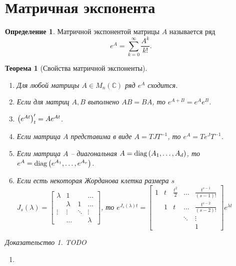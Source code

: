 \documentclass[a5paper, 10pt]{article}
\theoremstyle{definition}
\newtheorem{Def}{Определение}
\theoremstyle{plain}
\newtheorem{Th}{Теорема}
\theoremstyle{remark}
\newtheorem*{Proof}{Доказательство}
\begin{document}
	\section{Матричная экспонента}
		\begin{Def}
			Матричной экспонентой матрицы $A$ называется ряд
			\[
			e^A = \sum\limits_{k=0}^{\infty} \frac{A^k}{k!}.
			\]
		\end{Def}
		\begin{Th}[Свойства матричной экспоненты]
			\hspace{0pt}
			\begin{enumerate}
				\item Для любой матрицы $A \in M_n(\mathbb{C})$ ряд $e^A$ сходится.
				\item Если для матриц $A, B$ выполнено $AB=BA$, то $e^{A+B} = e^A e^B$.
				\item $\left(e^{At}\right)'_t = A e^{At}$.
				\item Если матрица $A$ представима в виде $A = TJT^{-1}$, то $e^A = T e^J T^{-1}$.
				\item Если матрица $A$ -- диагональная $A = \operatorname{diag} \left(A_1, \dots, A_d\right)$, то $e^A = \operatorname{diag} \left(e^{A_1}, \dots, e^{A_r}\right)$.
				\item Если есть некоторая Жорданова клетка размера $s$ $J_s(\lambda) = \begin{bmatrix}
					\lambda & 1 & & \dots \\
					 & \lambda & 1 & \dots \\
					\vdots & \vdots & \ddots & \vdots \\
					 & \dots   && \lambda 
				\end{bmatrix}$, то $e^{J_s(\lambda)t} = \begin{bmatrix}
				1 & t & \frac{t^2}{2} & \dots & \frac{t^{s-1}}{(s-1)!} \\
				 & 1 & t & \dots & \frac{t^{s-2}}{(s-2)!} \\
				& & & \ddots & \vdots \\
				& & & & 1
			\end{bmatrix} e^{\lambda t}$ 
			\end{enumerate}
		
			\begin{Proof}
				TODO
				\begin{enumerate}
					\item 
				\end{enumerate}
			\end{Proof}
		\end{Th}
		
\end{document}
